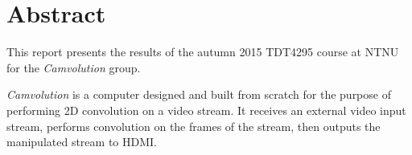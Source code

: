 \chapter*{Abstract}
This report presents the results of the autumn 2015 TDT4295 course at NTNU for the \textit{Camvolution} group.

\textit{Camvolution} is a computer designed and built from scratch for the purpose of performing 2D convolution on a video stream.
It receives an external video input stream,
performs convolution on the frames of the stream,
then outputs the manipulated stream to HDMI.
